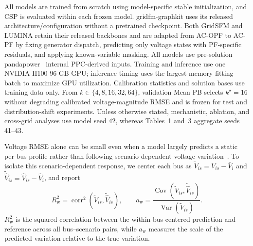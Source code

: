 \documentclass{article}
\begin{document}
All models are trained from scratch using model-specific stable
initialization, and CSP is evaluated within each frozen model.
gridfm-graphkit uses its released architecture/configuration without a
pretrained checkpoint. Both GridSFM and LUMINA retain their released backbones and are adapted
from AC-OPF to AC-PF by fixing generator dispatch, predicting only voltage
states with PF-specific residuals, and applying known-variable masking.
All models use pre-solution pandapower~\cite{zimmerman2011matpower,thurner2018pandapower} internal PPC-derived inputs. Training and inference use one NVIDIA H100 96-GB GPU; inference timing uses the
largest memory-fitting batch to maximize GPU utilization. Calibration statistics and solution
bases use training data only. From $k\in\{4,8,16,32,64\}$, validation
Mean PB selects $k^\star=16$ without degrading calibrated
voltage-magnitude RMSE and is frozen for test and distribution-shift experiments.
Unless otherwise stated, mechanistic, ablation, and cross-grid analyses
use model seed 42, whereas Tables~1 and~3 aggregate seeds 41--43.

Voltage RMSE alone can be small even when a model largely predicts a
static per-bus profile rather than following scenario-dependent voltage
variation~\cite{yang2026gridsfm}. To isolate this scenario-dependent
response, we center each bus as
$\tilde{V}_{is}=V_{is}-\bar{V}_i$ and
$\tilde{\hat{V}}_{is}=\hat{V}_{is}-\bar{\hat{V}}_i$, and report
\begin{equation}
R_{\mathrm{w}}^2
=
\operatorname{corr}^2
\left(\tilde{V}_{is},\tilde{\hat{V}}_{is}\right),
\qquad
a_{\mathrm{w}}
=
\frac{\operatorname{Cov}
\left(\tilde{V}_{is},\tilde{\hat{V}}_{is}\right)}
{\operatorname{Var}\left(\tilde{V}_{is}\right)} .
\end{equation}
$R_{\mathrm{w}}^2$ is the squared correlation between the within-bus-centered
prediction and reference across all bus--scenario pairs, while
$a_{\mathrm{w}}$ measures the scale of the predicted variation
relative to the true variation.
\end{document}
